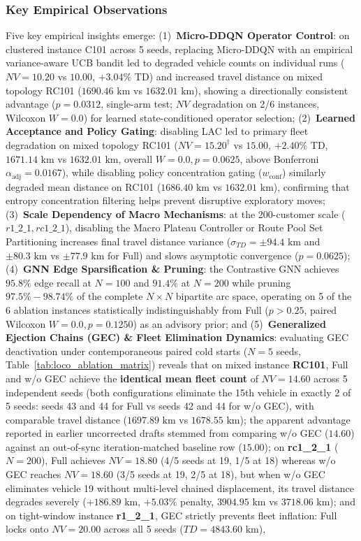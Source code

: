 \documentclass{ieeeaccess}
\begin{document}
\subsubsection{Key Empirical Observations}
Five key empirical insights emerge: (1)~\textbf{Micro-DDQN Operator Control}: on clustered instance C101 across 5 seeds, replacing Micro-DDQN with an empirical variance-aware UCB bandit led to degraded vehicle counts on individual runs ($NV=10.20$ vs $10.00$, $+3.04\%$ TD) and increased travel distance on mixed topology RC101 ($1690.46\text{ km}$ vs $1632.01\text{ km}$), showing a directionally consistent advantage ($p=0.0312$, single-arm test; $NV$ degradation on 2/6 instances, Wilcoxon $W=0.0$) for learned state-conditioned operator selection; (2)~\textbf{Learned Acceptance and Policy Gating}: disabling LAC led to primary fleet degradation on mixed topology RC101 ($NV=15.20^\dagger$ vs $15.00$, $+2.40\%$ TD, $1671.14\text{ km}$ vs $1632.01\text{ km}$, overall $W=0.0, p=0.0625$, above Bonferroni $\alpha_{\text{adj}}=0.0167$), while disabling policy concentration gating ($w_{\text{conf}}$) similarly degraded mean distance on RC101 ($1686.40\text{ km}$ vs $1632.01\text{ km}$), confirming that entropy concentration filtering helps prevent disruptive exploratory moves; (3)~\textbf{Scale Dependency of Macro Mechanisms}: at the 200-customer scale ($r1\_2\_1, rc1\_2\_1$), disabling the Macro Plateau Controller or Route Pool Set Partitioning increases final travel distance variance ($\sigma_{TD} = \pm 94.4\text{ km}$ and $\pm 80.3\text{ km}$ vs $\pm 77.9\text{ km}$ for Full) and slows asymptotic convergence ($p=0.0625$); (4)~\textbf{GNN Edge Sparsification \& Pruning}: the Contrastive GNN achieves $95.8\%$ edge recall at $N=100$ and $91.4\%$ at $N=200$ while pruning $97.5\%-98.74\%$ of the complete $N \times N$ bipartite arc space, operating on 5 of the 6 ablation instances statistically indistinguishably from Full ($p > 0.25$, paired Wilcoxon $W=0.0, p=0.1250$) as an advisory prior; and (5)~\textbf{Generalized Ejection Chains (GEC) \& Fleet Elimination Dynamics}: evaluating GEC deactivation under contemporaneous paired cold starts ($N=5$ seeds, Table~\ref{tab:loco_ablation_matrix}) reveals that on mixed instance \textbf{RC101}, \textsf{Full} and \textsf{w/o GEC} achieve the \textbf{identical mean fleet count} of $NV=14.60$ across 5 independent seeds (both configurations eliminate the 15th vehicle in exactly 2 of 5 seeds: seeds 43 and 44 for Full vs seeds 42 and 44 for w/o GEC), with comparable travel distance ($1697.89\text{ km}$ vs $1678.55\text{ km}$); the apparent advantage reported in earlier uncorrected drafts stemmed from comparing w/o GEC ($14.60$) against an out-of-sync iteration-matched baseline row ($15.00$); on \textbf{rc1\_2\_1} ($N=200$), \textsf{Full} achieves $NV=18.80$ (4/5 seeds at 19, 1/5 at 18) whereas \textsf{w/o GEC} reaches $NV=18.60$ (3/5 seeds at 19, 2/5 at 18), but when \textsf{w/o GEC} eliminates vehicle 19 without multi-level chained displacement, its travel distance degrades severely ($+186.89\text{ km}$, $+5.03\%$ penalty, $3904.95\text{ km}$ vs $3718.06\text{ km}$); and on tight-window instance \textbf{r1\_2\_1}, GEC strictly prevents fleet inflation: \textsf{Full} locks onto $NV=20.00$ across all 5 seeds ($TD=4843.60\text{ km}$), 
\end{document}
